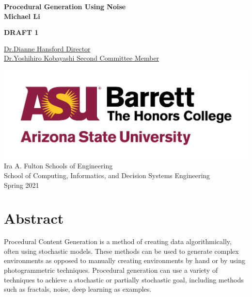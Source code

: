 \documentclass[12pt]{report}
\begin{document}
	\begin{titlepage}
		\begin{center}
			\Large
			\textbf{Procedural Generation Using Noise}\\
			
			\vspace{1.5cm}
			\normalsize
			\textbf{Michael Li}\\
			
			\vfill
			
			\textbf{DRAFT 1}
			
			\uline{Dr.Dianne Hansford \hfill Director}\\
			\vspace{1.5cm}
			\uline{Dr.Yoshihiro Kobayashi \hfill Second Committee Member}\\
			
			\vspace{3cm}
			
			\includegraphics[scale=.5]{asu_barretthonors_horiz_rgb_maroongold_600ppi}\\
			\vspace{1.5cm}
			Ira A. Fulton Schools of Engineering \\
			School of Computing, Informatics, and Decision Systems Engineering\\
			Spring 2021
		\end{center}
	\end{titlepage}
	
	\chapter*{Abstract}
	Procedural Content Generation is a method of creating data algorithmically, often using stochastic models. These methods can be used to generate complex environments as opposed to manually creating environments by hand or by using photogrammetric techniques. Procedural generation can use a variety of techniques to achieve a stochastic or partially stochastic goal, including methods such as fractals,  noise, deep learning as examples. \\
	\clearpage
	
\end{document}
